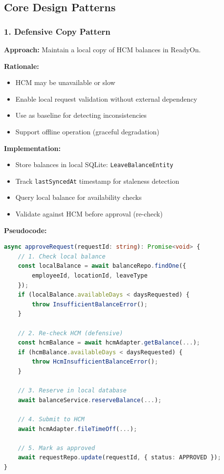 \documentclass[12pt,a4paper]{article}
\begin{document}
\subsection{Core Design Patterns}

\subsubsection{1. Defensive Copy Pattern}

\textbf{Approach:} Maintain a local copy of HCM balances in ReadyOn.

\textbf{Rationale:}
\begin{itemize}
    \item HCM may be unavailable or slow
    \item Enable local request validation without external dependency
    \item Use as baseline for detecting inconsistencies
    \item Support offline operation (graceful degradation)
\end{itemize}

\textbf{Implementation:}
\begin{itemize}
    \item Store balances in local SQLite: \texttt{LeaveBalanceEntity}
    \item Track \texttt{lastSyncedAt} timestamp for staleness detection
    \item Query local balance for availability checks
    \item Validate against HCM before approval (re-check)
\end{itemize}

\textbf{Pseudocode:}
\begin{lstlisting}[language=TypeScript]
async approveRequest(requestId: string): Promise<void> {
    // 1. Check local balance
    const localBalance = await balanceRepo.findOne({
        employeeId, locationId, leaveType
    });
    if (localBalance.availableDays < daysRequested) {
        throw InsufficientBalanceError();
    }
    
    // 2. Re-check HCM (defensive)
    const hcmBalance = await hcmAdapter.getBalance(...);
    if (hcmBalance.availableDays < daysRequested) {
        throw HcmInsufficientBalanceError();
    }
    
    // 3. Reserve in local database
    await balanceService.reserveBalance(...);
    
    // 4. Submit to HCM
    await hcmAdapter.fileTimeOff(...);
    
    // 5. Mark as approved
    await requestRepo.update(requestId, { status: APPROVED });
}
\end{lstlisting}
\end{document}

